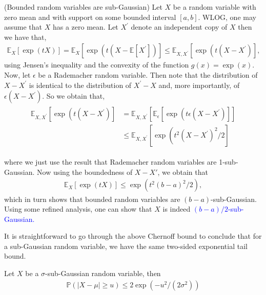 \begin{eg}
    (Bounded random variables are sub-Gaussian) Let $X$ be a random variable with zero mean and with support on some bounded interval $[a, b]$. WLOG, one may assume that $X$ has a zero mean. Let $X^{\prime}$ denote an independent copy of $X$ then we have that,
\begin{align*}
\mathbb{E}_X[\exp (t X)]=\mathbb{E}_X\left[\exp \left(t\left(X-\mathbb{E}\left[X^{\prime}\right]\right)\right] \leq \mathbb{E}_{X, X^{\prime}}\left[\exp \left(t\left(X-X^{\prime}\right)\right],\right.\right.
\end{align*}
using Jensen's inequality and the convexity of the function $g(x)=\exp (x)$.
Now, let $\epsilon$ be a Rademacher random variable. Then note that the distribution of $X-X^{\prime}$ is identical to the distribution of $X^{\prime}-X$ and, more importantly, of $\epsilon\left(X-X^{\prime}\right)$. So we obtain that,
\begin{align*}
\begin{aligned}
\mathbb{E}_{X, X^{\prime}}\left[\exp \left(t\left(X-X^{\prime}\right)\right]\right. & =\mathbb{E}_{X, X^{\prime}}\left[\mathbb{E}_\epsilon\left[\exp \left(t \epsilon\left(X-X^{\prime}\right)\right]\right]\right. \\
& \leq \mathbb{E}_{X, X^{\prime}}\left[\exp \left(t^2\left(X-X^{\prime}\right)^2 / 2\right]\right.
\end{aligned}
\end{align*}

where we just use the result that Rademacher random variables are 1-sub-Gaussian. Now using the boundedness of $X-X'$, we obtain that
\begin{align*}
\mathbb{E}_X[\exp (t X)] \leq \exp \left(t^2(b-a)^2 / 2\right),
\end{align*}
which in turn shows that bounded random variables are $(b-a)$-sub-Gaussian. Using some refined analysis, one can show that $X$ is indeed \textcolor{blue}{$(b-a)/2$-sub-Gaussian.}
\end{eg}
 

It is straightforward to go through the above Chernoff bound to conclude that for a sub-Gaussian random variable, we have the same two-sided exponential tail bound.

\begin{thm}
Let $X$ be a $\sigma$-sub-Gaussian random variable, then
\begin{align*}
\mathbb{P}(|X-\mu| \geq u) \leq 2 \exp \left(-u^2 /\left(2 \sigma^2\right)\right)
\end{align*}
\end{thm}



